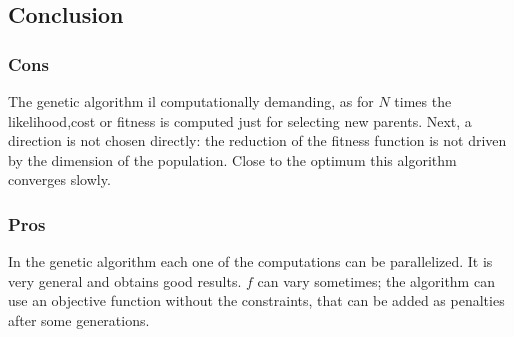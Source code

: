   \subsection{Conclusion}

    \subsubsection{Cons}
    The genetic algorithm il computationally demanding, as for $N$ times the likelihood,cost or fitness is computed just for selecting new parents.
    Next, a direction is not chosen directly: the reduction of the fitness function is not driven by the dimension of the population.
    Close to the optimum this algorithm converges slowly.

    \subsubsection{Pros}
    In the genetic algorithm each one of the computations can be parallelized.
    It is very general and obtains good results.
    \(f\) can vary sometimes; the algorithm can use an objective function without the constraints, that can be added as penalties after some generations.
